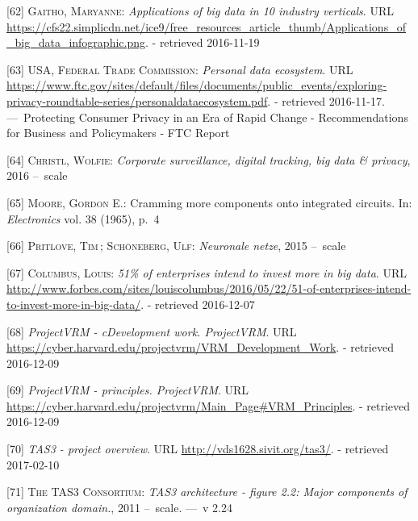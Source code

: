\documentclass[12pt,english,a4paper,titlepage,cleardoublepage=empty,dottedtoc]{report}
\begin{document}
\hypertarget{ref-graphic_2015_applications-of-big-data-in-10-industry-verticals}{}
{[}62{]} \textsc{Gaitho, Maryanne}: \emph{Applications of big data in 10
industry verticals}. URL
\url{https://cfs22.simplicdn.net/ice9/free_resources_article_thumb/Applications_of_big_data_infographic.png}.
- retrieved 2016-11-19

\hypertarget{ref-graphic_2012_personal-data-ecosystem}{}
{[}63{]} \textsc{USA, Federal Trade Commission}: \emph{Personal data
ecosystem}. URL
\url{https://www.ftc.gov/sites/default/files/documents/public_events/exploring-privacy-roundtable-series/personaldataecosystem.pdf}.
- retrieved 2016-11-17. ---~Protecting Consumer Privacy in an Era of
Rapid Change - Recommendations for Business and Policymakers - FTC
Report

\hypertarget{ref-video_2016_corporate-surveillance-digital-tracking-big-data-privacy}{}
{[}64{]} \textsc{Christl, Wolfie}: \emph{Corporate surveillance, digital
tracking, big data \& privacy}, 2016 --~scale

\hypertarget{ref-paper_1965_moors-law}{}
{[}65{]} \textsc{Moore, Gordon E.}: Cramming more components onto
integrated circuits. In: \emph{Electronics} vol. 38 (1965), p.~4

\hypertarget{ref-podcast_2015_cre-neuronale-netze}{}
{[}66{]} \textsc{Pritlove, Tim}\,; \textsc{Schöneberg, Ulf}:
\emph{Neuronale netze}, 2015 --~scale

\hypertarget{ref-web_2016_industries-intention-to-invest-in-big-data}{}
{[}67{]} \textsc{Columbus, Louis}: \emph{51\% of enterprises intend to
invest more in big data}. URL
\url{http://www.forbes.com/sites/louiscolumbus/2016/05/22/51-of-enterprises-intend-to-invest-more-in-big-data/}.
- retrieved 2016-12-07

\hypertarget{ref-web_2016_projectvrm_development-work}{}
{[}68{]} \emph{ProjectVRM - cDevelopment work. ProjectVRM}. URL
\url{https://cyber.harvard.edu/projectvrm/VRM_Development_Work}. -
retrieved 2016-12-09

\hypertarget{ref-web_2016_projectvrm_principles}{}
{[}69{]} \emph{ProjectVRM - principles. ProjectVRM}. URL
\url{https://cyber.harvard.edu/projectvrm/Main_Page\#VRM_Principles}. -
retrieved 2016-12-09

\hypertarget{ref-web_2011_tas3-project}{}
{[}70{]} \emph{TAS3 - project overview}. URL
\url{http://vds1628.sivit.org/tas3/}. - retrieved 2017-02-10

\hypertarget{ref-graphic_2011_architecture_components-of-organization-domain}{}
{[}71{]} \textsc{The TAS3 Consortium}: \emph{TAS3 architecture - figure
2.2: Major components of organization domain.}, 2011 --~scale. ---~v
2.24
\end{document}
